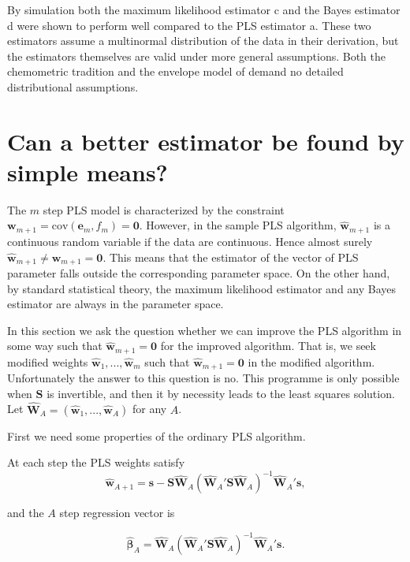 \documentclass[num-refs]{wiley-article}
\begin{document}
By simulation both the maximum likelihood estimator c and the Bayes estimator d were shown to perform well compared to the PLS estimator a. These two estimators assume a multinormal distribution of the data in their derivation, but the estimators themselves are valid under more general assumptions. Both the chemometric tradition and the envelope model of \citet{cook2010envelope, cook2013envelopes} demand no detailed distributional assumptions.


\section{Can a better estimator be found by simple means?}

The $m$ step PLS model is characterized by the constraint $\bm{w}_{m+1}=\mathrm{cov}(\bm{e}_m ,f_m)=\bm{0}$. However, in the sample PLS algorithm, $\widehat{\bm{w}}_{m+1}$ is a continuous random variable if the data are continuous. Hence almost surely $\widehat{\bm{w}}_{m+1}\ne\bm{w}_{m+1}=\bm{0}$. This means that the estimator of the vector of PLS parameter falls outside the corresponding parameter space. On the other hand, by standard statistical theory, the maximum likelihood estimator and any Bayes estimator are always in the parameter space.

In this section we ask the question whether we can improve the PLS algorithm in some way such that $\widehat{\bm{w}}_{m+1}=\bm{0}$ for the improved algorithm. That is, we seek modified weights $\widehat{\bm{w}}_{1},...,\widehat{\bm{w}}_{m}$ such that $\widehat{\bm{w}}_{m+1}=\bm{0}$ in the modified algorithm. Unfortunately the answer to this question is no. This programme is only possible when $\bm{S}$ is invertible, and then it by necessity leads to the least squares solution. Let $\widehat{\bm{W}}_A=(\widehat{\bm{w}}_1,...,\widehat{\bm{w}}_A)$ for any $A$.

First we need some properties of the ordinary PLS algorithm.
\bigskip

\begin{proposition}
  At each step the PLS weights satisfy
  \begin{equation}
    \widehat{\bm{w}}_{A+1} =
    \bm{s}-\bm{S}\widehat{\bm{W}}_{A}
    (\widehat{\bm{W}}_{A}'\bm{S}\widehat{\bm{W}}_{A})^{-1}
    \widehat{\bm{W}}_{A}'\bm{s},
    \label{weight}
  \end{equation}

  and the $A$ step regression vector is

  \begin{equation}
    \widehat{\bm{\beta}}_{A} =
    \widehat{\bm{W}}_{A}
    (\widehat{\bm{W}}_{A}'\bm{S}\widehat{\bm{W}}_{A})^{-1}
    \widehat{\bm{W}}_{A}'\bm{s}.
    \label{regression}
  \end{equation}
\end{proposition}
\end{document}
